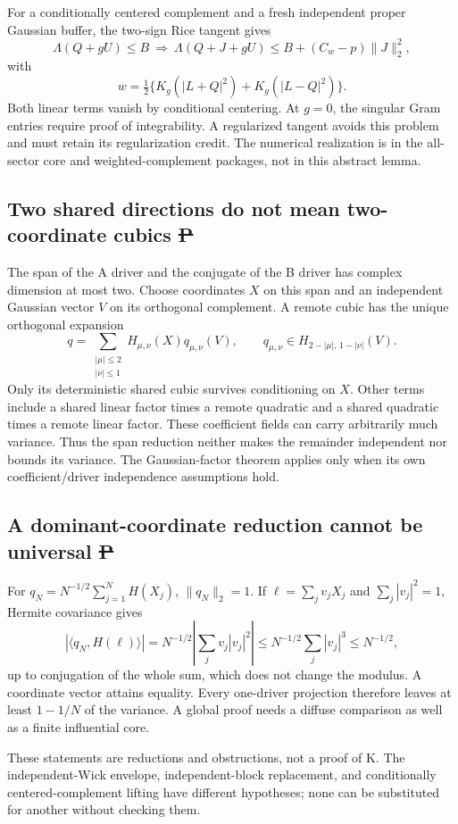 For a conditionally centered complement and a fresh independent proper
Gaussian buffer, the two-sign Rice tangent gives
\[
 \Lambda(Q+gU)\le B
 \ \Longrightarrow\
 \Lambda(Q+J+gU)\le B+(C_w-p)\|J\|_2^2,
\]
with
\[
 w=\tfrac12\{K_g(|L+Q|^2)+K_g(|L-Q|^2)\}.
\]
Both linear terms vanish by conditional centering. At $g=0$, the
singular Gram entries require proof of integrability. A regularized
tangent avoids this problem and must retain its regularization credit.
The numerical realization is in the all-sector core and
weighted-complement packages, not in this abstract lemma.

\subsection{Two shared directions do not mean two-coordinate cubics \st{P}}
The span of the A driver and the conjugate of the B driver has complex
dimension at most two. Choose coordinates $X$ on this span and an
independent Gaussian vector $V$ on its orthogonal complement. A remote
cubic has the unique orthogonal expansion
\[
 q=\sum_{\substack{|\mu|\le2\\|\nu|\le1}}
 H_{\mu,\nu}(X)q_{\mu,\nu}(V),\qquad
 q_{\mu,\nu}\in H_{2-|\mu|,\,1-|\nu|}(V).
\]
Only its deterministic shared cubic survives conditioning on $X$.
Other terms include a shared linear factor times a remote quadratic
and a shared quadratic times a remote linear factor. These coefficient
fields can carry arbitrarily much variance. Thus the span reduction
neither makes the remainder independent nor bounds its variance.
The Gaussian-factor theorem applies only when its own coefficient/driver
independence assumptions hold.

\subsection{A dominant-coordinate reduction cannot be universal \st{P}}
For $q_N=N^{-1/2}\sum_{j=1}^N H(X_j)$, $\|q_N\|_2=1$. If
$\ell=\sum_jv_jX_j$ and $\sum_j|v_j|^2=1$, Hermite covariance gives
\[
 |\langle q_N,H(\ell)\rangle|
 =N^{-1/2}\left|\sum_j v_j|v_j|^2\right|
 \le N^{-1/2}\sum_j|v_j|^3\le N^{-1/2},
\]
up to conjugation of the whole sum, which does not change the modulus.
A coordinate vector attains equality. Every one-driver projection
therefore leaves at least $1-1/N$ of the variance. A global proof needs
a diffuse comparison as well as a finite influential core.

These statements are reductions and obstructions, not a proof of K.
The independent-Wick envelope, independent-block replacement, and
conditionally centered-complement lifting have different hypotheses;
none can be substituted for another without checking them.

